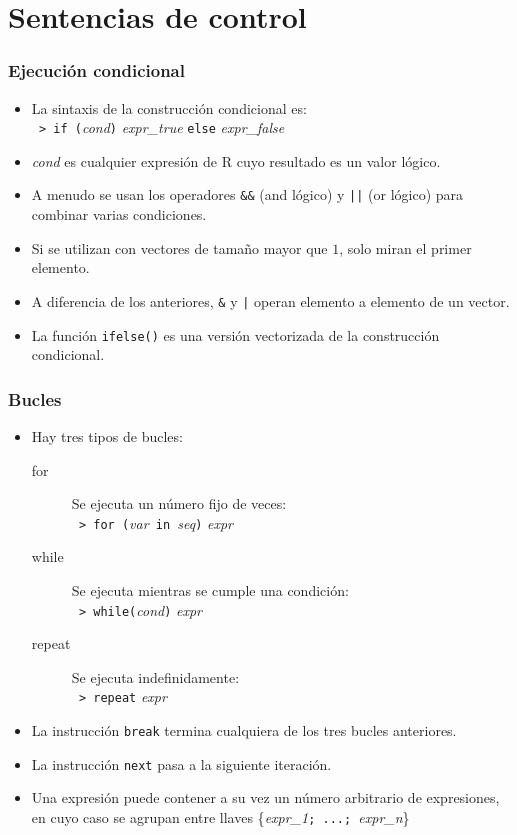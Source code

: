 \documentclass{beamer}
\begin{document}
\section{Sentencias de control}

\begin{frame}[fragile]
\frametitle{Ejecución condicional}
\begin{itemize}
\item La sintaxis de la construcción condicional es: \\ \texttt{   > if (}\textit{cond}\texttt{)} \textit{expr\_true} \texttt{else} \textit{expr\_false}
\item \textit{cond} es cualquier expresión de R cuyo resultado es un valor lógico.
\item A menudo se usan los operadores \texttt{\&\&} (and lógico) y \texttt{||} (or lógico) para combinar varias condiciones.
\item Si se utilizan con vectores de tamaño mayor que $1$, solo miran el primer elemento.
\item A diferencia de los anteriores, \texttt{\&} y \texttt{|} operan elemento a elemento de un vector.
\item La función \texttt{ifelse()} es una versión vectorizada de la construcción condicional.
\end{itemize}
\end{frame}

\begin{frame}[fragile]
\frametitle{Bucles}
\begin{itemize}
\item Hay tres tipos de bucles:
\begin{description}
\item[for] Se ejecuta un número fijo de veces: \\\texttt{   > for (}\textit{var}\texttt{ in }\textit{seq}\texttt{)} \textit{expr}
\item[while] Se ejecuta mientras se cumple una condición: \\\texttt{   > while(}\textit{cond}\texttt{)} \textit{expr}
\item[repeat] Se ejecuta indefinidamente: \\\texttt{   > repeat} \textit{expr}
\end{description}
\item La instrucción \texttt{break} termina cualquiera de los tres bucles anteriores.
\item La instrucción \texttt{next} pasa a la siguiente iteración.
\item Una expresión puede contener a su vez un número arbitrario de expresiones, en cuyo caso se agrupan entre llaves \{\textit{expr\_1}\texttt{; ...; }\textit{expr\_n}\}
\end{itemize}
\end{frame}
\end{document}
